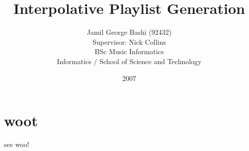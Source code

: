 \documentclass[a4paper,titlepage]{book}
\title{Interpolative Playlist Generation}
\author{Jamil George Bashi (92432)\\
\small Supervisor: Nick Collins\\[2cm]
\large BSc Music Informatics\\
\small Informatics / School of Science and Technology}
\date{\Large 2007}
\begin{document}

\mainmatter
\pagestyle{headings}
\chapter{woot}
see \citep*{klapuri-transcription} woo!

\end{document}
